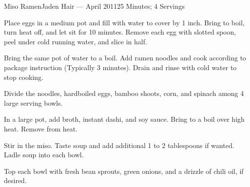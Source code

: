 \documentclass{article}
\begin{document}
\begin{recipe}{Miso Ramen}{Jaden Hair --- April 2011}{25 Minutes; 4 Servings}

    Place eggs in a medium pot and fill with water to cover by 1 inch. Bring to boil, turn heat off, and let sit for 10 minutes. Remove each egg with slotted spoon, peel under cold running water, and slice in half. 

    Bring the same pot of water to a boil. Add ramen noodles and cook according to package instruction (Typically 3 minutes). Drain and rinse with cold water to stop cooking.

    Divide the noodles, hardboiled eggs, bamboo shoots, corn, and spinach among 4 large serving bowls.

    In a large pot, add broth, instant dashi, and soy sauce. Bring to a boil over high heat. Remove from heat.

    Stir in the miso. Taste soup and add additional 1 to 2 tablespoons if wanted. Ladle soup into each bowl.

    Top each bowl with fresh bean sprouts, green onions, and a drizzle of chili oil, if desired.

\end{recipe}
\end{document}
